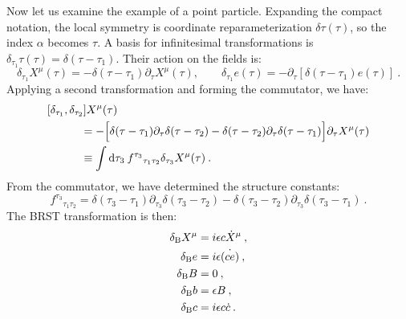 Now let us examine the example of a point particle. Expanding the compact notation, the local symmetry is coordinate reparameterization $\delta \tau(\tau)$, so the index $\alpha$ becomes $\tau$. A basis for infinitesimal transformations is $\delta_{\tau_{1}} \tau(\tau)=\delta(\tau-\tau_{1})$. Their action on the fields is:
\begin{equation}
	\delta_{\tau_{1}} X^{\mu}(\tau)=-\delta(\tau-\tau_{1}) \partial_{\tau} X^{\mu}(\tau), \qquad 
	\delta_{\tau_{1}} e(\tau)=-\partial_{\tau}[\delta(\tau-\tau_{1}) e(\tau)] \:. \label{4.2.19}
\end{equation}
Applying a second transformation and forming the commutator, we have:
\begin{align}
	&[\delta_{\tau_{1}}, \delta_{\tau_{2}}] X^{\mu}(\tau) \nonumber  \\
	&\qquad\quad =-\Bigl[\delta(\tau-\tau_{1}) \partial_{\tau} \delta(\tau-\tau_{2})-\delta(\tau-\tau_{2}) \partial_{\tau} \delta(\tau-\tau_{1})\Bigr] \partial_{\tau} X^{\mu}(\tau) \nonumber  \\
	&\qquad\quad  \equiv \int \mathrm{d} \tau_{3}\: f^{\tau_{3}}{}_{\tau_{1} \tau_{2}} \delta_{\tau_{3}} X^{\mu}(\tau) \:. \label{4.2.20}
\end{align}
From the commutator, we have determined the structure constants:
\begin{equation}
	f^{\tau_{3}}{}_{\tau_{1} \tau_{2}}=\delta(\tau_{3}-\tau_{1}) \partial_{\tau_{3}} \delta(\tau_{3}-\tau_{2})
	-\delta(\tau_{3}-\tau_{2}) \partial_{\tau_{3}} \delta(\tau_{3}-\tau_{1}) \:. \label{4.2.21}
\end{equation}
The BRST transformation is then:
\begin{subequations}
	\begin{align}
		\delta_{\mathrm{B}} X^{\mu}&=i \epsilon c \dot{X}^{\mu} \:, \label{4.2.22a} \\
		\delta_{\mathrm{B}} e&=i \epsilon\dot{(c e)} \:, \label{4.2.22b} \\
		\delta_{\mathrm{B}} B&=0 \:, \label{4.2.22c} \\
		\delta_{\mathrm{B}} b&=\epsilon B \:, \label{4.2.22d} \\
		\delta_{\mathrm{B}} c&=i \epsilon c \dot{c} \:. \label{4.2.22e} 
	\end{align}
\end{subequations}


